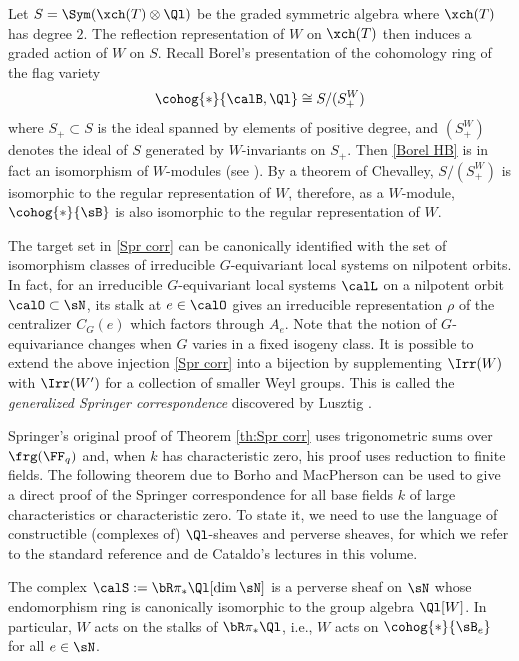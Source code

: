 Let $S=\Sym(\xch(T)\otimes\Ql)$ be the graded symmetric algebra where $\xch(T)$ has degree $2$. The reflection representation of $W$ on $\xch(T)$ then induces a graded action of $W$ on $S$. Recall Borel's presentation of the cohomology ring of the flag variety
\begin{equation}\label{Borel HB}
\cohog{*}{\calB,\Ql}\cong S/(S^{W}_{+})
\end{equation}
where $S_{+}\subset S$ is the ideal spanned by elements of positive degree, and $(S^{W}_{+})$ denotes the ideal of $S$ generated by $W$-invariants on $S_{+}$. Then \eqref{Borel HB} is in fact an isomorphism of $W$-modules (see \cite[Prop 7.2]{Springer}). By a theorem of Chevalley, $S/(S^{W}_{+})$ is isomorphic to the regular representation of $W$, therefore, as a $W$-module, $\cohog{*}{\sB}$ is also isomorphic to the regular representation of $W$.  

\begin{remark} The target set in \eqref{Spr corr} can be canonically identified with the set of isomorphism classes of irreducible $G$-equivariant local systems on nilpotent orbits. In fact, for an irreducible $G$-equivariant local systems $\calL$ on a nilpotent orbit $\calO\subset\sN$, its stalk at $e\in\calO$ gives an irreducible representation $\rho$ of the centralizer $C_{G}(e)$ which factors through $A_{e}$. Note that the notion of $G$-equivariance changes when $G$ varies in a fixed isogeny class.  It is possible to extend the above injection \eqref{Spr corr} into a bijection by supplementing $\Irr(W)$ with $\Irr(W')$ for a collection of smaller Weyl groups. This is called the {\em generalized Springer correspondence} discovered by Lusztig \cite{LuIC}.
\end{remark}

Springer's original proof of Theorem \ref{th:Spr corr} uses trigonometric sums over $\frg(\FF_{q})$ and, when $k$ has characteristic zero, his proof uses reduction to finite fields. The following theorem due to Borho and MacPherson \cite{BM} can be used to give a direct proof of the Springer correspondence for all base fields $k$ of large characteristics or characteristic zero. To state it, we need to use the language of constructible (complexes of) $\Ql$-sheaves and perverse sheaves, for which we refer to the standard reference \cite{BBD} and de Cataldo's lectures \cite{dC} in this volume. 

\begin{theorem}\label{th:BM} The complex $\calS:=\bR\pi_{*}\Ql[\dim\sN]$ is a perverse sheaf on $\sN$ whose endomorphism ring is canonically isomorphic to the group algebra $\Ql[W]$. In particular, $W$ acts on the stalks of $\bR\pi_{*}\Ql$, i.e., $W$ acts on $\cohog{*}{\sB_{e}}$ for all $e\in\sN$.
\end{theorem}


